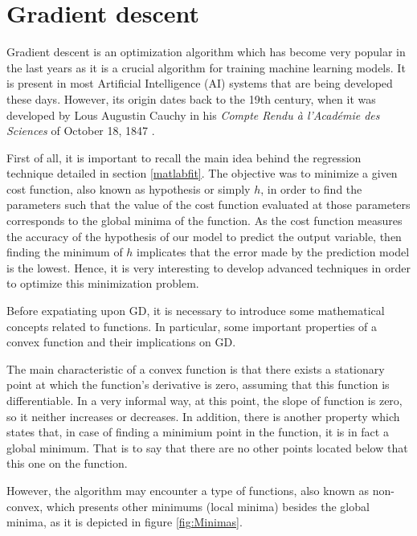 \documentclass[a4paper, report, oneside, UKenglish]{memoir}
\begin{document}

\section{Gradient descent}

Gradient descent is an optimization algorithm which has become very popular in the last years as it is a crucial algorithm for training machine learning models. It is present in most Artificial Intelligence (AI) systems that are being developed these days. However, its origin dates back to the 19th century, when it was developed by Lous Augustin Cauchy in his \textit{Compte Rendu à l’Académie des Sciences} of October 18, 1847 \cite{cauchy}.

First of all, it is important to recall the main idea behind the regression technique detailed in section \ref{matlabfit}. The objective was to minimize a given cost function, also known as hypothesis or simply $h$, in order to find the parameters such that the value of the cost function evaluated at those parameters corresponds to the global minima of the function. As the cost function measures the accuracy of the hypothesis of our model to predict the output variable, then finding the minimum of $h$ implicates that the error made by the prediction model is the lowest. Hence, it is very interesting to develop advanced techniques in order to optimize this minimization problem. 

Before expatiating upon GD, it is necessary to introduce some mathematical concepts related to functions. In particular, some important properties of a convex function and their implications on GD. 

The main characteristic of a convex function is that there exists a stationary point at which the function's derivative is zero, assuming that this function is differentiable. In a very informal way, at this point, the slope of function is zero, so it neither increases or decreases. In addition, there is another property which states that, in case of finding a minimium point in the function, it is in fact a global minimum. That is to say that there are no other points located below that this one on the function. 

However, the algorithm may encounter a type of functions, also known as non-convex, which presents other minimums (local minima) besides the global minima, as it is depicted in figure \ref{fig:Minimas}.
\end{document}
